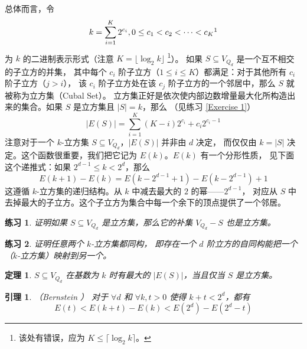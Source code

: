 \documentclass[12pt, a4paper]{article}
\newtheorem{theorem}{定理}
\newtheorem{lemma}{引理}
\newtheorem{exercise}{练习}
\begin{document}
总体而言，令
\begin{equation*}
k = \sum_{i = 1}^K 2^{c_i}, 0 \le c_1 < c_2 < \cdots < c_K \footnotemark
\end{equation*}
为 $k$ 的二进制表示形式（注意 $K = \lfloor \log_2 k \rfloor$
\footnote{该处有错误，应为 $K \le \lceil \log_2 k \rceil$。}）。
如果 $S \subseteq V_{Q_d}$ 是一个互不相交的子立方的并集，
其中每个 $c_i$ 阶子立方（$1 \le i \le K$）都满足：对于其他所有 $c_i$ 阶子立方（$j > i$），
该 $c_i$ 阶子立方处在该 $c_j$ 阶子立方的一个邻居中，那么 $S$ 就被称为立方集（Cubal Set）。
立方集正好是依次使内部边数增量最大化所构造出来的集合。如果 $S$ 是立方集且 $|S| = k$，那么
（见练习 \ref{Exercise 1}）
\begin{equation*}
|E(S)| = \sum_{i = 1}^K (K - i) 2^{c_i} + c_i 2^{c_i - 1}
\end{equation*}
注意对于一个 $k$-立方集 $S \subseteq V_{Q_d}$，$|E(S)|$ 并非由 $d$ 决定，
而仅仅由 $k = |S|$ 决定。这个函数很重要，我们把它记为 $E(k)$。$E(k)$ 有一个分形性质，
见下面这个递推式：如果 $2^{d - 1} \le k < 2^d$，那么
\begin{equation*}
E(k + 1) − E(k) = E(k − 2^{d − 1} + 1) − E(k − 2^{d − 1}) + 1
\end{equation*}
这遵循 $k$-立方集的递归结构。从 $k$ 中减去最大的 $2$ 的幂——$2^{d − 1}$，
对应从 $S$ 中去掉最大的子立方。这个子立方为集合中每一个余下的顶点提供了一个邻居。

\begin{exercise}
\label{Exercise 8}
证明如果 $S \subseteq V_{Q_d}$ 是立方集，那么它的补集 $V_{Q_d} − S$ 也是立方集。
\end{exercise}

\begin{exercise}
\label{Exercise 9}
证明任意两个 $k$-立方集都同构，
即存在一个 $d$ 阶立方的自同构能把一个（$k$-立方集）映射到另一个。
\end{exercise}

\begin{theorem}
\label{Theorem 1}
$S \subseteq V_{Q_d}$ 在基数为 $k$ 时有最大的 $|E(S)|$，当且仅当 $S$ 是立方集。
\end{theorem}

\begin{lemma}
\label{Lemma 3}
（Bernstein \cite{Bernstein.1967}）
对于 $\forall d$ 和 $\forall k, t > 0$ 使得 $k + t < 2^d$，都有
\begin{equation*}
E(t) < E(k + t) − E(k) < E(2^d) − E(2^d − t)
\end{equation*}
\end{lemma}
\end{document}
